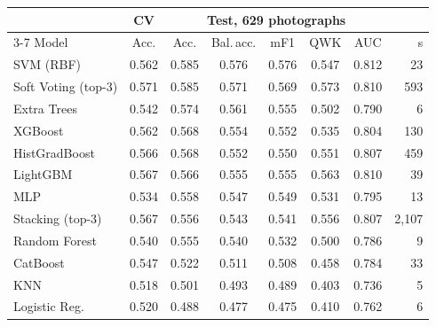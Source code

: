 \begin{tabular}{@{}lccccccr@{}}
\toprule
 & CV & \multicolumn{5}{c}{Test, 629 photographs} & \\
\cmidrule(lr){3-7}
Model & Acc. & Acc. & Bal.\,acc. & mF1 & QWK & AUC & s\\
\midrule
SVM (RBF) & 0.562 & 0.585 & 0.576 & 0.576 & 0.547 & 0.812 & 23 \\
Soft Voting (top-3) & 0.571 & 0.585 & 0.571 & 0.569 & 0.573 & 0.810 & 593 \\
Extra Trees & 0.542 & 0.574 & 0.561 & 0.555 & 0.502 & 0.790 & 6 \\
XGBoost & 0.562 & 0.568 & 0.554 & 0.552 & 0.535 & 0.804 & 130 \\
HistGradBoost & 0.566 & 0.568 & 0.552 & 0.550 & 0.551 & 0.807 & 459 \\
LightGBM & 0.567 & 0.566 & 0.555 & 0.555 & 0.563 & 0.810 & 39 \\
MLP & 0.534 & 0.558 & 0.547 & 0.549 & 0.531 & 0.795 & 13 \\
Stacking (top-3) & 0.567 & 0.556 & 0.543 & 0.541 & 0.556 & 0.807 & 2{,}107 \\
Random Forest & 0.540 & 0.555 & 0.540 & 0.532 & 0.500 & 0.786 & 9 \\
CatBoost & 0.547 & 0.522 & 0.511 & 0.508 & 0.458 & 0.784 & 33 \\
KNN & 0.518 & 0.501 & 0.493 & 0.489 & 0.403 & 0.736 & 5 \\
Logistic Reg. & 0.520 & 0.488 & 0.477 & 0.475 & 0.410 & 0.762 & 6 \\
\bottomrule
\end{tabular}
